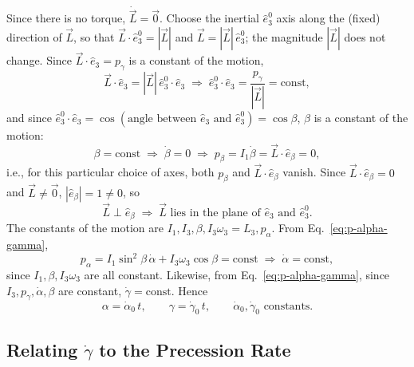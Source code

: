 \documentclass[11pt]{article}
\newcommand{\ebeta}{\hat e_{\beta}}
\begin{document}
Since there is no torque, $\dot{\vec L}=\vec 0$. Choose the inertial $\hat e_3^0$ axis along the (fixed) direction of $\vec L$, so that $\vec L\cdot\hat e_3^0=|\vec L|$ and $\vec L=|\vec L|\,\hat e_3^0$; the magnitude $|\vec L|$ does not change. Since $\vec L\cdot\hat e_3=p_\gamma$ is a constant of the motion,
\begin{equation}
\vec L\cdot\hat e_3 = |\vec L|\,\hat e_3^0\cdot\hat e_3 \;\Rightarrow\; \hat e_3^0\cdot\hat e_3 = \frac{p_\gamma}{|\vec L|} = \text{const},
\label{eq:e3-e3zero-const}
\end{equation}
and since $\hat e_3^0\cdot\hat e_3=\cos(\text{angle between }\hat e_3\text{ and }\hat e_3^0)=\cos\beta$, $\beta$ is a constant of the motion:
\begin{equation}
\beta = \text{const} \;\Rightarrow\; \dot\beta=0 \;\Rightarrow\; p_\beta = I_1\dot\beta = \vec L\cdot\ebeta = 0,
\label{eq:beta-const}
\end{equation}
i.e., for this particular choice of axes, both $p_\beta$ and $\vec L\cdot\ebeta$ vanish. Since $\vec L\cdot\ebeta=0$ and $\vec L\neq\vec 0$, $|\ebeta|=1\neq0$, so
\begin{equation}
\vec L\perp\ebeta \;\Rightarrow\; \vec L \text{ lies in the plane of } \hat e_3 \text{ and } \hat e_3^0.
\label{eq:L-in-plane}
\end{equation}
The constants of the motion are $I_1,I_3,\beta,I_3\omega_3=L_3,p_\alpha$. From Eq.~\eqref{eq:p-alpha-gamma},
\begin{equation}
p_\alpha = I_1\sin^2\beta\,\dot\alpha+I_3\omega_3\cos\beta = \text{const} \;\Rightarrow\; \dot\alpha=\text{const},
\label{eq:alpha-const}
\end{equation}
since $I_1,\beta,I_3\omega_3$ are all constant. Likewise, from Eq.~\eqref{eq:p-alpha-gamma}, since $I_3,p_\gamma,\dot\alpha,\beta$ are constant, $\dot\gamma=\text{const}$. Hence
\begin{equation}
\alpha=\dot\alpha_0\,t, \qquad \gamma=\dot\gamma_0\,t, \qquad \dot\alpha_0,\dot\gamma_0 \text{ constants.}
\label{eq:alpha-gamma-linear}
\end{equation}

\subsection{\texorpdfstring{Relating $\dot\gamma$ to the Precession Rate}{Relating gamma-dot to the Precession Rate}}
\end{document}
